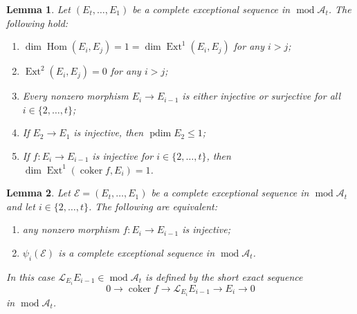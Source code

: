 \documentclass[10pt,a4paper]{amsart}
\newtheorem{lemma}{Lemma}
\newcommand{\A}{\mathscr{A}}
\newcommand{\Ecal}{\mathcal{E}}
\DeclareMathOperator{\Ext}{Ext}
\DeclareMathOperator{\Hom}{Hom}
\newcommand{\Lcal}{\mathcal{L}}
\DeclareMathOperator{\coker}{coker}
\DeclareMathOperator{\mods}{mod}
\DeclareMathOperator{\projdim}{pdim}
\begin{document}
\begin{lemma}\label{lem:completeexcepprop}
    Let $(E_t, \dots, E_1)$ be a complete exceptional sequence in $\mods \A_t$. The following hold:
    \begin{enumerate}
        \item $\dim \Hom(E_i, E_j) = 1 = \dim \Ext^1(E_i,E_j)$ for any $i>j$;
        \item $\Ext^2(E_i, E_j)=0$ for any $i>j$; 
        \item Every nonzero morphism $E_i \to E_{i-1}$ is either injective or surjective for all $i \in \{2, \dots, t\}$;
        \item If $E_2 \to E_1$ is injective, then $\projdim E_2 \leq 1$;
        \item If $f:E_i \to E_{i-1}$ is injective for $i \in \{2, \dots, t\}$, then $\dim \Ext^1(\coker f, E_i)=1$.
    \end{enumerate} 
\end{lemma}

\begin{lemma}\label{lem:excepmutdesc}
    Let $\Ecal = (E_t, \dots, E_1)$ be a complete exceptional sequence in $\mods \A_t$ and let $i \in \{2, \dots, t\}$. The following are equivalent:
    \begin{enumerate}
        \item any nonzero morphism $f: E_{i} \to E_{i-1}$ is injective;
        \item $\psi_i(\Ecal)$ is a complete exceptional sequence in $\mods \A_t$.
    \end{enumerate} 
    In this case $\Lcal_{E_i} E_{i-1} \in \mods \A_t$ is defined by the short exact sequence
    \begin{equation}\label{eq:leftmutseq} 0 \to \coker f \to \Lcal_{E_i} E_{i-1} \to E_i \to 0\end{equation}
    in $\mods \A_t$.
\end{lemma}
\end{document}
